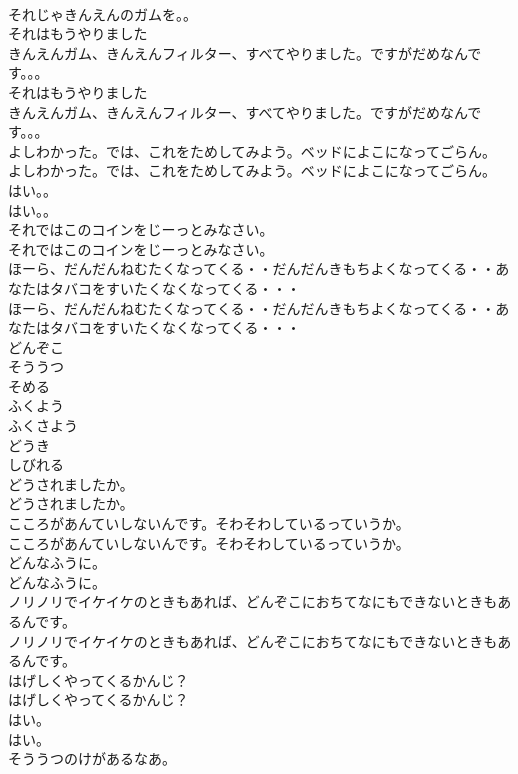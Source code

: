 \documentclass[8pt]{extreport}
\begin{document}
\begin{CJK}{UTF8}{min}
\\	それじゃきんえんのガムを。。
\\	それはもうやりました
\\	きんえんガム、きんえんフィルター、すべてやりました。ですがだめなんです。。。
\\	それはもうやりました
\\	きんえんガム、きんえんフィルター、すべてやりました。ですがだめなんです。。。
\\	よしわかった。では、これをためしてみよう。ベッドによこになってごらん。
\\	よしわかった。では、これをためしてみよう。ベッドによこになってごらん。
\\	はい。。
\\	はい。。
\\	それではこのコインをじーっとみなさい。
\\	それではこのコインをじーっとみなさい。
\\	ほーら、だんだんねむたくなってくる・・だんだんきもちよくなってくる・・あなたはタバコをすいたくなくなってくる・・・
\\	ほーら、だんだんねむたくなってくる・・だんだんきもちよくなってくる・・あなたはタバコをすいたくなくなってくる・・・
\\	どんぞこ
\\	そううつ
\\	そめる
\\	ふくよう
\\	ふくさよう
\\	どうき
\\	しびれる
\\	どうされましたか。
\\	どうされましたか。
\\	こころがあんていしないんです。そわそわしているっていうか。
\\	こころがあんていしないんです。そわそわしているっていうか。
\\	どんなふうに。
\\	どんなふうに。
\\	ノリノリでイケイケのときもあれば、どんぞこにおちてなにもできないときもあるんです。
\\	ノリノリでイケイケのときもあれば、どんぞこにおちてなにもできないときもあるんです。
\\	はげしくやってくるかんじ？
\\	はげしくやってくるかんじ？
\\	はい。
\\	はい。
\\	そううつのけがあるなあ。

\end{CJK}
\end{document}

